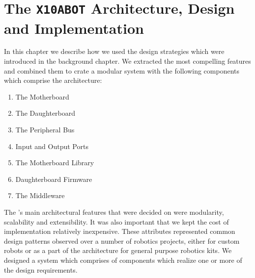 \chapter{The \texttt{X10ABOT} Architecture, Design and Implementation}%
\label{cha:the_x10abot_architecture_design_and_implementation}


In this chapter we describe how we used the design strategies which were introduced in the background chapter. We extracted the most compelling features and combined them to crate a modular system with the following components which comprise the \xten architecture:
\begin{enumerate}
\item The Motherboard
\item The Daughterboard
\item The Peripheral Bus
\item Input and Output Ports
\item The Motherboard Library
\item Daughterboard Firmware
\item The Middleware
\end{enumerate}



The \xten 's main architectural features that were decided on were modularity, scalability and extensibility. It was also important that we kept the cost of implementation relatively inexpensive. These attributes represented common design patterns observed over a number of robotics projects, either for custom robots or as a part of the architecture for general purpose robotics kits. We designed a system which comprises of components which realize one or more of the design requirements.

\newpage
